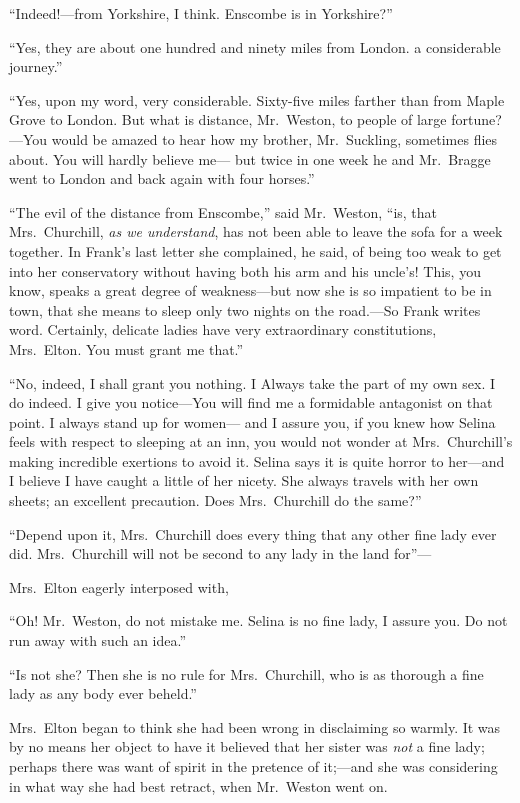 ``Indeed!---from Yorkshire, I think.  Enscombe is in Yorkshire?''

``Yes, they are about one hundred and ninety miles from London.
a considerable journey.''

``Yes, upon my word, very considerable.  Sixty-five miles farther
than from Maple Grove to London.  But what is distance, Mr.\ Weston,
to people of large fortune?---You would be amazed to hear how my brother,
Mr.\ Suckling, sometimes flies about.  You will hardly believe me---%
but twice in one week he and Mr.\ Bragge went to London and back again
with four horses.''

``The evil of the distance from Enscombe,'' said Mr.\ Weston, ``is, that
Mrs.\ Churchill, \emph{as we understand}, has not been able to leave the
sofa for a week together.  In Frank's last letter she complained,
he said, of being too weak to get into her conservatory without having
both his arm and his uncle's! This, you know, speaks a great degree
of weakness---but now she is so impatient to be in town, that she
means to sleep only two nights on the road.---So Frank writes word.
Certainly, delicate ladies have very extraordinary constitutions,
Mrs.\ Elton.  You must grant me that.''

``No, indeed, I shall grant you nothing.  I Always take the part
of my own sex.  I do indeed.  I give you notice---You will find me
a formidable antagonist on that point.  I always stand up for women---%
and I assure you, if you knew how Selina feels with respect
to sleeping at an inn, you would not wonder at Mrs.\ Churchill's
making incredible exertions to avoid it.  Selina says it is quite
horror to her---and I believe I have caught a little of her nicety.
She always travels with her own sheets; an excellent precaution.
Does Mrs.\ Churchill do the same?''

``Depend upon it, Mrs.\ Churchill does every thing that any other
fine lady ever did.  Mrs.\ Churchill will not be second to any lady
in the land for''---%

Mrs.\ Elton eagerly interposed with,

``Oh!  Mr.\ Weston, do not mistake me.  Selina is no fine lady,
I assure you.  Do not run away with such an idea.''

``Is not she?  Then she is no rule for Mrs.\ Churchill, who is
as thorough a fine lady as any body ever beheld.''

Mrs.\ Elton began to think she had been wrong in disclaiming so warmly.
It was by no means her object to have it believed that her sister
was \emph{not} a fine lady; perhaps there was want of spirit in the pretence
of it;---and she was considering in what way she had best retract,
when Mr.\ Weston went on.

